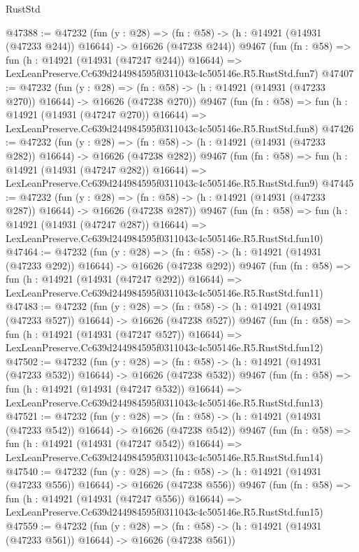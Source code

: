 \begin{lexlean}{RustStd}
\begin{coremodule}
@47388 := @47232
    (fun (y : @28) =>
    (fn : @58) -> (h : @14921 (@14931 (@47233 @244)) @16644) -> @16626 (@47238 @244))
    @9467
    (fun (fn : @58) =>
    fun (h : @14921 (@14931 (@47247 @244)) @16644) =>
    LexLeanPreserve.Cc639d244984595f0311043c4c505146e.R5.RustStd.fun7)
@47407 := @47232
    (fun (y : @28) =>
    (fn : @58) -> (h : @14921 (@14931 (@47233 @270)) @16644) -> @16626 (@47238 @270))
    @9467
    (fun (fn : @58) =>
    fun (h : @14921 (@14931 (@47247 @270)) @16644) =>
    LexLeanPreserve.Cc639d244984595f0311043c4c505146e.R5.RustStd.fun8)
@47426 := @47232
    (fun (y : @28) =>
    (fn : @58) -> (h : @14921 (@14931 (@47233 @282)) @16644) -> @16626 (@47238 @282))
    @9467
    (fun (fn : @58) =>
    fun (h : @14921 (@14931 (@47247 @282)) @16644) =>
    LexLeanPreserve.Cc639d244984595f0311043c4c505146e.R5.RustStd.fun9)
@47445 := @47232
    (fun (y : @28) =>
    (fn : @58) -> (h : @14921 (@14931 (@47233 @287)) @16644) -> @16626 (@47238 @287))
    @9467
    (fun (fn : @58) =>
    fun (h : @14921 (@14931 (@47247 @287)) @16644) =>
    LexLeanPreserve.Cc639d244984595f0311043c4c505146e.R5.RustStd.fun10)
@47464 := @47232
    (fun (y : @28) =>
    (fn : @58) -> (h : @14921 (@14931 (@47233 @292)) @16644) -> @16626 (@47238 @292))
    @9467
    (fun (fn : @58) =>
    fun (h : @14921 (@14931 (@47247 @292)) @16644) =>
    LexLeanPreserve.Cc639d244984595f0311043c4c505146e.R5.RustStd.fun11)
@47483 := @47232
    (fun (y : @28) =>
    (fn : @58) -> (h : @14921 (@14931 (@47233 @527)) @16644) -> @16626 (@47238 @527))
    @9467
    (fun (fn : @58) =>
    fun (h : @14921 (@14931 (@47247 @527)) @16644) =>
    LexLeanPreserve.Cc639d244984595f0311043c4c505146e.R5.RustStd.fun12)
@47502 := @47232
    (fun (y : @28) =>
    (fn : @58) -> (h : @14921 (@14931 (@47233 @532)) @16644) -> @16626 (@47238 @532))
    @9467
    (fun (fn : @58) =>
    fun (h : @14921 (@14931 (@47247 @532)) @16644) =>
    LexLeanPreserve.Cc639d244984595f0311043c4c505146e.R5.RustStd.fun13)
@47521 := @47232
    (fun (y : @28) =>
    (fn : @58) -> (h : @14921 (@14931 (@47233 @542)) @16644) -> @16626 (@47238 @542))
    @9467
    (fun (fn : @58) =>
    fun (h : @14921 (@14931 (@47247 @542)) @16644) =>
    LexLeanPreserve.Cc639d244984595f0311043c4c505146e.R5.RustStd.fun14)
@47540 := @47232
    (fun (y : @28) =>
    (fn : @58) -> (h : @14921 (@14931 (@47233 @556)) @16644) -> @16626 (@47238 @556))
    @9467
    (fun (fn : @58) =>
    fun (h : @14921 (@14931 (@47247 @556)) @16644) =>
    LexLeanPreserve.Cc639d244984595f0311043c4c505146e.R5.RustStd.fun15)
@47559 := @47232
    (fun (y : @28) =>
    (fn : @58) -> (h : @14921 (@14931 (@47233 @561)) @16644) -> @16626 (@47238 @561))

\end{coremodule}
\end{lexlean}

